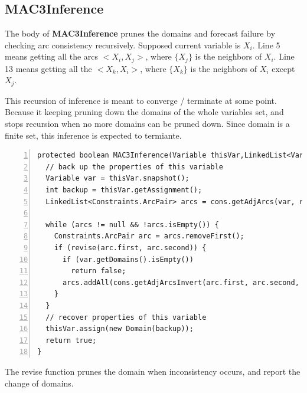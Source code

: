 \documentclass{article}
\begin{document}
\clearpage
\subsection{MAC3Inference}

The body of \textbf{MAC3Inference} prunes the domains and forecast failure by checking arc consistency recursively. Supposed current variable is $X_i$. Line 5 means getting all the arcs $<X_i, X_j>$, where $\{X_j\}$ is the neighbors of $X_i$. Line 13 means getting all the $<X_k, X_i>$, where $\{X_k\}$ is the neighbors of $X_i$ except $X_j$.

This recursion of inference is meant to converge / terminate at some point.  Because it keeping pruning down the domains of the whole variables set, and stops recursion when no more domains can be pruned down. Since domain is a finite set, this inference is expected to termiante.

\begin{lstlisting}[numbers=left]   
protected boolean MAC3Inference(Variable thisVar,LinkedList<Variable> remain){
  // back up the properties of this variable
  Variable var = thisVar.snapshot();
  int backup = thisVar.getAssignment();
  LinkedList<Constraints.ArcPair> arcs = cons.getAdjArcs(var, remain);

  while (arcs != null && !arcs.isEmpty()) {
    Constraints.ArcPair arc = arcs.removeFirst();
    if (revise(arc.first, arc.second)) {
      if (var.getDomains().isEmpty())
        return false;
      arcs.addAll(cons.getAdjArcsInvert(arc.first, arc.second, remain));
    }
  }
  // recover properties of this variable
  thisVar.assign(new Domain(backup));
  return true;
}
\end{lstlisting}

The revise function prunes the domain when inconsistency occurs, and report the change of domains.
\end{document}
